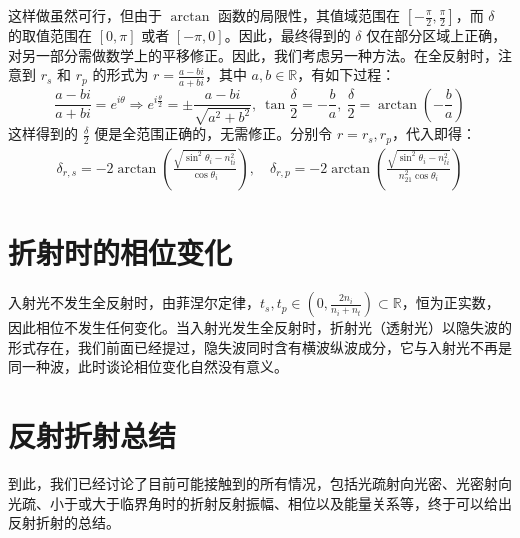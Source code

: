 \documentclass[UTF8]{report}
\def\R{\mathbb{R}}
\theoremstyle{MyLineTheoremStyle} %
\theoremstyle{MyBlockTheoremStyle} %
\theoremstyle{MySubsubsectionStyle} %
\begin{document}
这样做虽然可行，但由于 $\arctan $ 函数的局限性，其值域范围在 $[-\frac{\pi}{2}, \frac{\pi}{2}]$，而 $\delta $ 的取值范围在 $[0, \pi]$ 或者 $[-\pi, 0]$。因此，最终得到的 $\delta$ 仅在部分区域上正确，对另一部分需做数学上的平移修正。因此，我们考虑另一种方法。在全反射时，注意到 $r_s$ 和 $r_p$ 的形式为 $r = \frac{a - bi}{a +bi}$，其中 $a, b \in \R$，有如下过程：
\begin{equation}
\frac{a - bi}{a + bi} = e^{i \theta} \Longrightarrow e^{i \frac{\theta}{2}} = \pm \frac{a - bi}{\sqrt{a^2 + b^2} },\ \tan \frac{\delta}{2} = - \frac{b}{a},\ \frac{\delta}{2} = \arctan \left( - \frac{b}{a} \right)
\end{equation}
这样得到的 $\frac{\delta}{2}$ 便是全范围正确的，无需修正。分别令 $r = r_s, r_p$，代入即得：
\begin{gather}
\delta_{r,s} = - 2 \arctan \left( \frac{\sqrt{\sin^2 \theta_i - n_{ti}^2} }{\cos \theta_i} \right) 
,\quad 
\delta_{r,p} = - 2 \arctan \left( \frac{\sqrt{\sin^2 \theta_i - n_{ti}^2} }{n_{21}^2 \cos \theta_i} \right)
\end{gather}

\section{折射时的相位变化}

入射光不发生全反射时，由菲涅尔定律，$t_s, t_p \in (0, \frac{2n_i}{n_i + n_t}) \subset \R$，恒为正实数，因此相位不发生任何变化。当入射光发生全反射时，折射光（透射光）以隐失波的形式存在，我们前面已经提过，隐失波同时含有横波纵波成分，它与入射光不再是同一种波，此时谈论相位变化自然没有意义。


\section{反射折射总结}

到此，我们已经讨论了目前可能接触到的所有情况，包括光疏射向光密、光密射向光疏、小于或大于临界角时的折射反射振幅、相位以及能量关系等，终于可以给出反射折射的总结。
\end{document}
